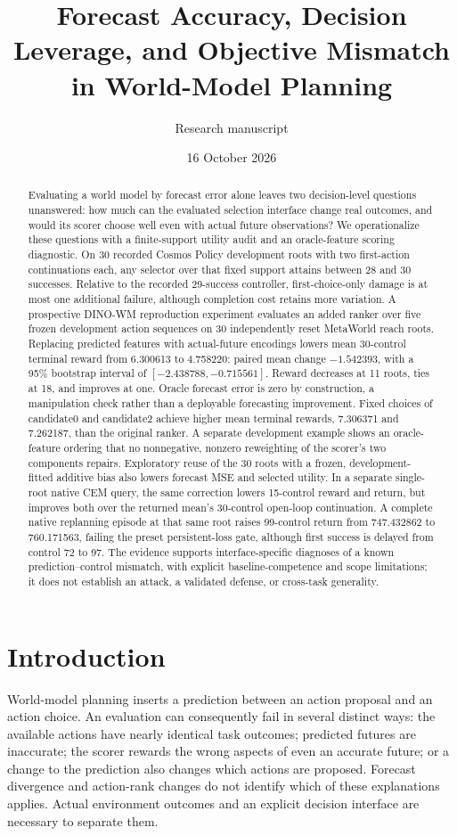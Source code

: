 \documentclass[11pt]{article}
\title{Forecast Accuracy, Decision Leverage, and Objective Mismatch\\
in World-Model Planning}
\author{Research manuscript}
\date{16 October 2026}
\begin{document}
\maketitle
\begin{abstract}
Evaluating a world model by forecast error alone leaves two decision-level
questions unanswered: how much can the evaluated selection interface change
real outcomes, and would its scorer choose well even with actual future
observations? We operationalize these questions with a finite-support utility
audit and an oracle-feature scoring diagnostic. On 30 recorded Cosmos Policy
development roots with two first-action continuations each, any selector over
that fixed support attains between 28 and 30 successes. Relative to the recorded
29-success controller, first-choice-only damage is at most one additional
failure, although completion cost retains more variation. A prospective DINO-WM
reproduction experiment evaluates an added ranker over five frozen development
action sequences on 30 independently reset MetaWorld reach roots. Replacing
predicted features with actual-future encodings lowers mean 30-control terminal
reward from 6.300613 to 4.758220: paired mean change $-1.542393$, with a
95\% bootstrap interval of $[-2.438788,-0.715561]$. Reward decreases at 11
roots, ties at 18, and improves at one. Oracle forecast error is zero by
construction, a manipulation check rather than a deployable forecasting
improvement. Fixed choices of candidate0 and candidate2 achieve higher mean
terminal rewards, 7.306371 and 7.262187, than the original ranker. A separate
development example shows an oracle-feature ordering that no nonnegative,
nonzero reweighting of the scorer's two components repairs. Exploratory reuse
of the 30 roots with a frozen, development-fitted additive bias also lowers
forecast MSE and selected utility. In a separate single-root native CEM query,
the same correction lowers 15-control reward and return, but improves both
over the returned mean's 30-control open-loop continuation. A complete native
replanning episode at that same root raises 99-control return from 747.432862
to 760.171563, failing the preset persistent-loss gate, although first success
is delayed from control 72 to 97. The evidence supports
interface-specific diagnoses of a known prediction--control mismatch, with
explicit baseline-competence and scope limitations; it does not establish
an attack, a validated defense, or cross-task generality.
\end{abstract}

\section{Introduction}
World-model planning inserts a prediction between an action proposal and an
action choice. An evaluation can consequently fail in several distinct ways:
the available actions have nearly identical task outcomes; predicted futures
are inaccurate; the scorer rewards the wrong aspects of even an accurate
future; or a change to the prediction also changes which actions are proposed.
Forecast divergence and action-rank changes do not identify which of these
explanations applies. Actual environment outcomes and an explicit decision
interface are necessary to separate them.
\end{document}
